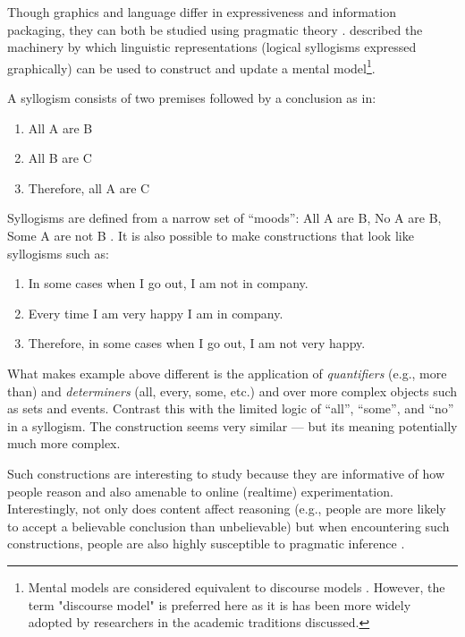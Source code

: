 Though graphics and language differ in expressiveness and information packaging, they can both be studied using pragmatic theory  \citep{Stenning:2002vd,Stenning:1995ka}. \cite{JohnsonLaird:1989uj}  described the machinery by which linguistic representations (logical syllogisms expressed graphically) can be used to construct and update a  mental model\footnote{Mental models are considered equivalent to discourse models \citep{JohnsonLaird:1980uf}. However, the term "discourse model" is preferred here as it is has been more widely adopted by researchers in the academic traditions discussed.}. 

A syllogism consists of two premises followed by a conclusion as in:

\begin{enumerate}
\item All A are B
\item All B are C
\item Therefore, all A are C
\end{enumerate}

Syllogisms are defined from a narrow set of ``moods'': All A are B, No A are B, Some A are not B  \citep{Khemlani:2012ii}.  It is also possible to make constructions that look like syllogisms such as:

\begin{enumerate}
\item In some cases when I go out, I am not in company.
\item Every time I am very happy I am in company.
\item Therefore, in some cases when I go out, I am not very happy. \cite[p. 1]{Khemlani:2012ii}
\end{enumerate}

What makes example above different is the application of \emph{quantifiers} (e.g., more than) and \emph{determiners} (all, every, some, etc.) and over more complex objects such as sets and events. Contrast this with the limited logic of ``all'', ``some'', and ``no'' in a syllogism. The construction seems very similar --- but its meaning potentially much more complex.

Such constructions are interesting to study because they are informative of how people reason and also amenable to online (realtime) experimentation. Interestingly, not only does content affect reasoning (e.g., people are more likely to accept a believable conclusion than unbelievable) but when encountering such constructions, people are also highly susceptible to pragmatic inference  \citep{Khemlani:2012ii}.  

